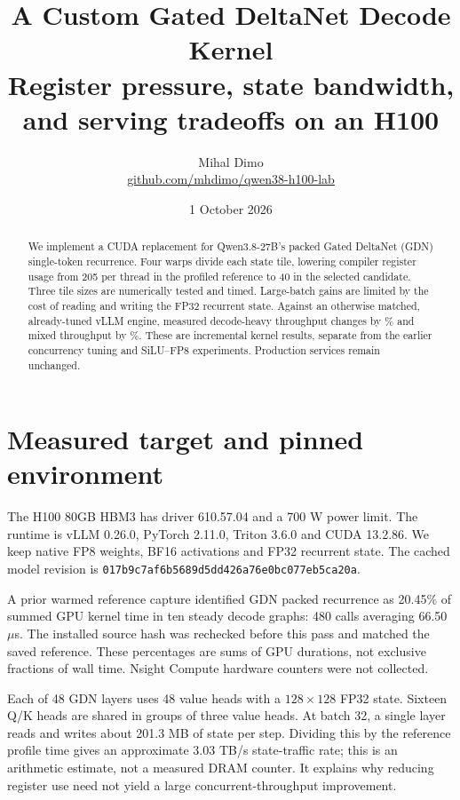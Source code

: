 \documentclass[10pt,a4paper]{article}
\title{\vspace{-10mm}\textbf{A Custom Gated DeltaNet Decode Kernel}\\[3pt]
\large Register pressure, state bandwidth, and serving tradeoffs on an H100}
\author{Mihal Dimo\\\small\href{https://github.com/mhdimo/qwen38-h100-lab}{github.com/mhdimo/qwen38-h100-lab}}\date{1 October 2026}
\begin{document}
\maketitle\thispagestyle{fancy}\vspace{-6mm}
\begin{abstract}
We implement a CUDA replacement for Qwen3.8-27B's packed Gated DeltaNet (GDN)
single-token recurrence. Four warps divide each state tile, lowering compiler
register usage from 205 per thread in the profiled reference to 40 in the selected
candidate. Three tile sizes are numerically tested and timed. Large-batch gains
are limited by the cost of reading and writing the FP32 recurrent state.
Against an otherwise matched, already-tuned vLLM engine, measured decode-heavy
throughput changes by \DecodeGain{}\% and mixed throughput by \MixedGain{}\%.
These are incremental kernel results, separate from the earlier concurrency
tuning and SiLU--FP8 experiments. Production services remain unchanged.
\end{abstract}

\section{Measured target and pinned environment}
The H100 80GB HBM3 has driver 610.57.04 and a 700 W power limit. The runtime is
vLLM 0.26.0, PyTorch 2.11.0, Triton 3.6.0 and CUDA 13.2.86. We keep native FP8
weights, BF16 activations and FP32 recurrent state. The cached model revision is
\texttt{017b9c7af6b5689d5dd426a76e0bc077eb5ca20a}.

A prior warmed reference capture identified GDN packed recurrence as 20.45\%
of summed GPU kernel time in ten steady decode graphs: 480 calls averaging
66.50~$\mu$s. The installed source hash was rechecked before this pass and matched
the saved reference. These percentages are sums of GPU durations, not exclusive
fractions of wall time. Nsight Compute hardware counters were not collected.

Each of 48 GDN layers uses 48 value heads with a $128\times128$ FP32 state.
Sixteen Q/K heads are shared in groups of three value heads. At batch 32, a single
layer reads and writes about 201.3 MB of state per step. Dividing this by the
reference profile time gives an approximate 3.03 TB/s state-traffic rate; this
is an arithmetic estimate, not a measured DRAM counter. It explains why reducing
register use need not yield a large concurrent-throughput improvement.
\end{document}
